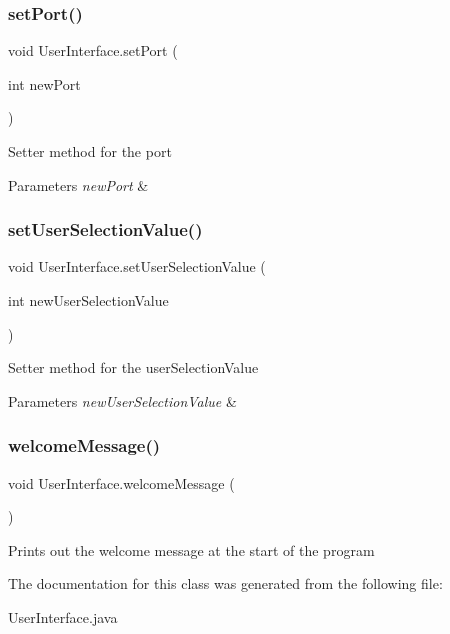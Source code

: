 \subsubsection{\texorpdfstring{set\+Port()}{setPort()}}
{\footnotesize\ttfamily void User\+Interface.\+set\+Port (\begin{DoxyParamCaption}\item[{int}]{new\+Port }\end{DoxyParamCaption})\hspace{0.3cm}{\ttfamily [inline]}}

Setter method for the port 
\begin{DoxyParams}{Parameters}
{\em new\+Port} & \\
\hline
\end{DoxyParams}
\mbox{\label{class_user_interface_ae26a8337ddbf851a470c112df194a768}} 
\subsubsection{\texorpdfstring{set\+User\+Selection\+Value()}{setUserSelectionValue()}}
{\footnotesize\ttfamily void User\+Interface.\+set\+User\+Selection\+Value (\begin{DoxyParamCaption}\item[{int}]{new\+User\+Selection\+Value }\end{DoxyParamCaption})\hspace{0.3cm}{\ttfamily [inline]}}

Setter method for the user\+Selection\+Value 
\begin{DoxyParams}{Parameters}
{\em new\+User\+Selection\+Value} & \\
\hline
\end{DoxyParams}
\mbox{\label{class_user_interface_a8541dc8e6383dfdf708f3307b77d3e83}} 
\subsubsection{\texorpdfstring{welcome\+Message()}{welcomeMessage()}}
{\footnotesize\ttfamily void User\+Interface.\+welcome\+Message (\begin{DoxyParamCaption}{ }\end{DoxyParamCaption})\hspace{0.3cm}{\ttfamily [inline]}}

Prints out the welcome message at the start of the program 

The documentation for this class was generated from the following file\+:\begin{DoxyCompactItemize}
\item 
User\+Interface.\+java\end{DoxyCompactItemize}
